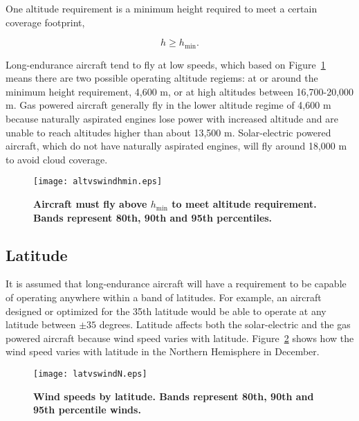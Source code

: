One altitude requirement is a minimum height required to meet a certain coverage footprint,

\begin{equation}
 h \geq h_{\text{min}}.
\end{equation}

Long-endurance aircraft tend to fly at low speeds, which based on Figure~\ref{f:altvswindhmin} means there are two possible operating altitude regiems: at or around the minimum height requirement, 4,600 m, or at high altitudes between 16,700-20,000 m. 
Gas powered aircraft generally fly in the lower altitude regime of 4,600 m because naturally aspirated engines lose power with increased altitude and are unable to reach altitudes higher than about 13,500 m.  
Solar-electric powered aircraft, which do not have naturally aspirated engines, will fly around 18,000 m to avoid cloud coverage.

\begin{figure}[H]
	\begin{center}
	\texttt{[image: altvswindhmin.eps]}
    \caption{\textbf{Aircraft must fly above $h_{\text{min}}$ to meet altitude requirement. Bands represent 80th, 90th and 95th percentiles.\cite{wind}}}
	\label{f:altvswindhmin}
	\end{center}
\end{figure}


\subsection{Latitude}

It is assumed that long-endurance aircraft will have a requirement to be capable of operating anywhere within a band of latitudes.  
For example, an aircraft designed or optimized for the 35th latitude would be able to operate at any latitude between $\pm35$ degrees. 
Latitude affects both the solar-electric and the gas powered aircraft because wind speed varies with latitude. 
Figure~\ref{f:latvswind} shows how the wind speed varies with latitude in the Northern Hemisphere in December. 

\begin{figure}[H]
	\begin{center}
	\texttt{[image: latvswindN.eps]}
    \caption{\textbf{Wind speeds by latitude.  Bands represent 80th, 90th and 95th percentile winds.\cite{wind} }}
	\label{f:latvswind}
	\end{center}
\end{figure}

